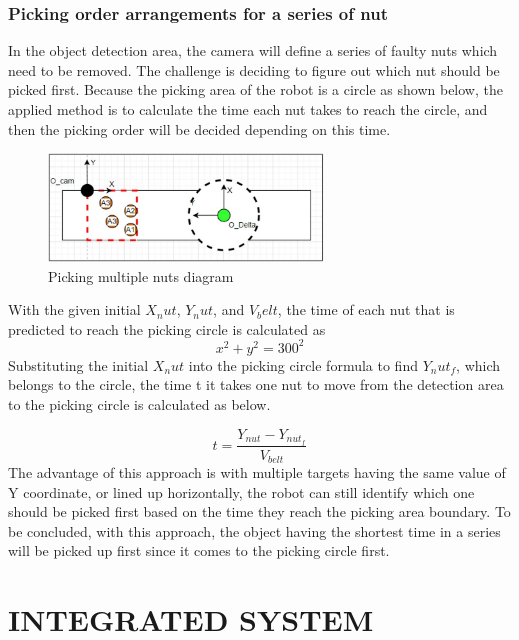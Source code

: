 \documentclass[10pt, letterpaper]{article}
\begin{document}
\subsubsection*{Picking order arrangements for a series of nut}
    In the object detection area, the camera will define a series of faulty nuts which need to be removed. The challenge is deciding to figure out which nut should be picked first. Because the picking area of the robot is a circle as shown below, the applied method is to calculate the time each nut takes to reach the circle, and then the picking order will be decided depending on this time.\par
    \begin{figure}[h]
        \centering
        \includegraphics[width=0.65\textwidth]{fig14.JPG}
        \caption{Picking multiple nuts diagram}
    \end{figure}
    With the given initial \(X_nut\), \(Y_nut\), and \(V_belt\), the time of each nut that is predicted to reach the picking circle is calculated as\\
    \begin{equation} \label{eq25} x^2 + y^2 = 300^2 \end{equation}
    Substituting the initial \(X_nut\) into the picking circle formula to find \(Y_nut_f\), which belongs to the circle, the time t it takes one nut to move from the detection area to the picking circle is calculated as below.\par
    \begin{equation} \label{eq26} t = \frac{Y_{nut} - Y_{nut_f}}{V_{belt}} \end{equation}
    The advantage of this approach is with multiple targets having the same value of Y coordinate, or lined up horizontally, the robot can still identify which one should be picked first based on the time they reach the picking area boundary.  To be concluded, with this approach, the object having the shortest time in a series will be picked up first since it comes to the picking circle first.\par

\section{INTEGRATED SYSTEM}
\end{document}
